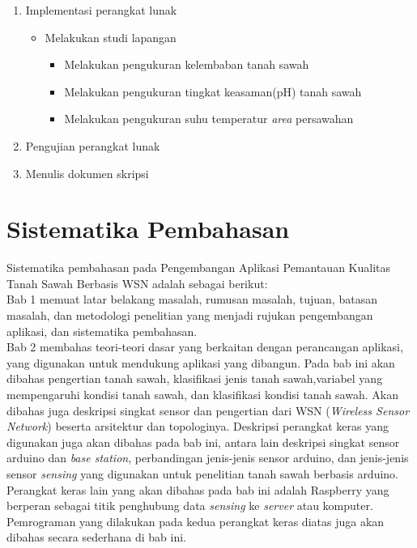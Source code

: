 \begin{enumerate}
		\item Implementasi perangkat lunak
    		\begin{itemize}
    		    \item Melakukan studi lapangan
		        \begin{itemize}
		            \item Melakukan pengukuran kelembaban tanah sawah
		            \item Melakukan pengukuran tingkat keasaman(pH) tanah sawah
		            \item Melakukan pengukuran suhu temperatur \textit{area} persawahan
		        \end{itemize}
    		\end{itemize}
		\item Pengujian perangkat lunak
		\item Menulis dokumen skripsi
	\end{enumerate}


\section{Sistematika Pembahasan}
\label{sec:sispem}
Sistematika pembahasan pada Pengembangan Aplikasi Pemantauan Kualitas Tanah Sawah Berbasis WSN adalah sebagai berikut:
\\

Bab 1 memuat latar belakang masalah, rumusan masalah, tujuan, batasan masalah, dan metodologi penelitian yang menjadi rujukan pengembangan aplikasi, dan sistematika pembahasan.
\\

Bab 2 membahas teori-teori dasar yang berkaitan dengan perancangan aplikasi, yang digunakan untuk mendukung aplikasi yang dibangun. Pada bab ini akan dibahas pengertian tanah sawah, klasifikasi jenis tanah sawah,variabel yang mempengaruhi kondisi tanah sawah, dan klasifikasi kondisi tanah sawah. Akan dibahas juga deskripsi singkat sensor dan pengertian dari  WSN (\textit{Wireless Sensor Network}) beserta arsitektur dan topologinya. Deskripsi perangkat keras yang digunakan juga akan dibahas pada bab ini, antara lain deskripsi singkat sensor arduino dan \textit{base station}, perbandingan jenis-jenis sensor arduino, dan jenis-jenis sensor \textit{sensing} yang digunakan untuk penelitian tanah sawah berbasis arduino. Perangkat keras lain yang akan dibahas pada bab ini adalah Raspberry yang berperan sebagai titik penghubung data \textit{sensing} ke \textit{server} atau komputer. Pemrograman yang dilakukan pada kedua perangkat keras diatas juga akan dibahas secara sederhana di bab ini.
\\

